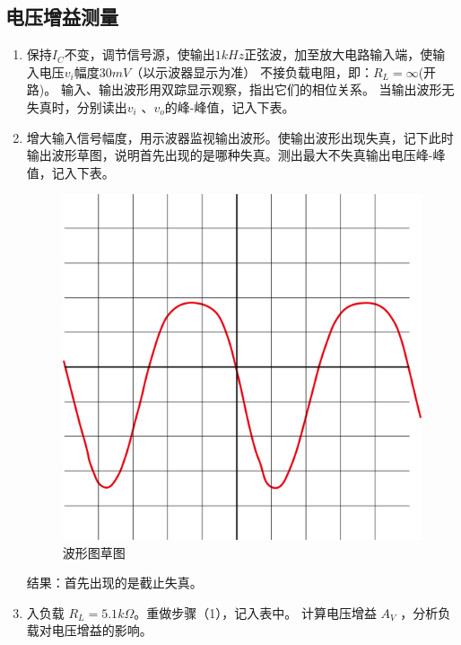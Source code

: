 \documentclass{../source/Experiment}
\begin{document}
            \subsection{电压增益测量}
            \begin{enumerate}
                \item 保持$I_C$不变，调节信号源，使输出$1kHz$正弦波，加至放大电路输入端，使输入电压$v_i$幅度$30mV$（以示波器显示为准）
                不接负载电阻，即：$R_L = \infty $(开路)。
                输入、输出波形用双踪显示观察，指出它们的相位关系。
                当输出波形无失真时，分别读出$v_i$ 、$v_o$的峰-峰值，记入下表。
                \item 增大输入信号幅度，用示波器监视输出波形。使输出波形出现失真，记下此时输出波形草图，说明首先出现的是哪种失真。测出最大不失真输出电压峰-峰值，记入下表。
                \\
                \newpage
                \begin{figure}[h]
                    \centering
                    \includegraphics[scale = 0.2]{pic/草图}
                    \caption{波形图草图}
                \end{figure}
                结果：首先出现的是截止失真。
                \item 入负载 $R_L= 5.1k\Omega$。重做步骤（1），记入表中。
                计算电压增益 $A_V$ ，分析负载对电压增益的影响。              

\end{enumerate}
\end{document}
